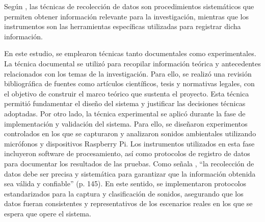 
Según \citeauthor{hernandez_metodologia_2014} \citeyear{hernandez_metodologia_2014}, las técnicas de recolección de datos son procedimientos sistemáticos que permiten obtener información relevante para la investigación, mientras que los instrumentos son las herramientas específicas utilizadas para registrar dicha información.

En este estudio, se emplearon técnicas tanto documentales como experimentales. La técnica documental se utilizó para recopilar información teórica y antecedentes relacionados con los temas de la investigación. Para ello, se realizó una revisión bibliográfica de fuentes como artículos científicos, tesis y normativas legales, con el objetivo de construir el marco teórico que sustenta el proyecto. Esta técnica permitió fundamentar el diseño del sistema y justificar las decisiones técnicas adoptadas. Por otro lado, la técnica experimental se aplicó durante la fase de implementación y validación del sistema. Para ello, se diseñaron experimentos controlados en los que se capturaron y analizaron sonidos ambientales utilizando micrófonos y dispositivos Raspberry Pi. Los instrumentos utilizados en esta fase incluyeron software de procesamiento, así como protocolos de registro de datos para documentar los resultados de las pruebas. Como señala \citeauthor{tamayo_proceso_2004} \citeyear{tamayo_proceso_2004}, ``la recolección de datos debe ser precisa y sistemática para garantizar que la información obtenida sea válida y confiable'' (p. 145). En este sentido, se implementaron protocolos estandarizados para la captura y clasificación de sonidos, asegurando que los datos fueran consistentes y representativos de los escenarios reales en los que se espera que opere el sistema.
